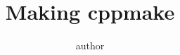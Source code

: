 \newcommand*{\BOOKCLASS}{}


\title{Making cppmake}
\author{author}
\maketitle
\tableofcontents




